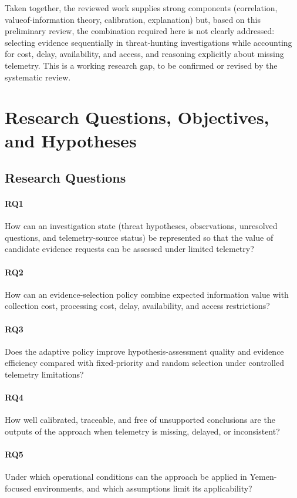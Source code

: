 \documentclass[a4paper,11pt,oneside]{article}
\begin{document}
Taken together, the reviewed work supplies strong components (correlation, valueof-information theory, calibration, explanation) but, based on this preliminary review, the combination required here is not clearly addressed: selecting evidence sequentially in threat-hunting investigations while accounting for cost, delay, availability, and access, and reasoning explicitly about missing telemetry. This is a working research gap, to be confirmed or revised by the systematic review.
\section{Research Questions, Objectives, and Hypotheses}
\subsection{Research Questions}
\paragraph{RQ1} How can an investigation state (threat hypotheses, observations, unresolved questions, and telemetry-source status) be represented so that the value of candidate evidence requests can be assessed under limited telemetry?
\paragraph{RQ2} How can an evidence-selection policy combine expected information value with
collection cost, processing cost, delay, availability, and access restrictions?
\paragraph{RQ3} Does the adaptive policy improve hypothesis-assessment quality and evidence
efficiency compared with fixed-priority and random selection under controlled telemetry limitations?
\paragraph{RQ4} How well calibrated, traceable, and free of unsupported conclusions are the outputs
of the approach when telemetry is missing, delayed, or inconsistent?
\paragraph{RQ5} Under which operational conditions can the approach be applied in Yemen-focused
environments, and which assumptions limit its applicability?
\end{document}
